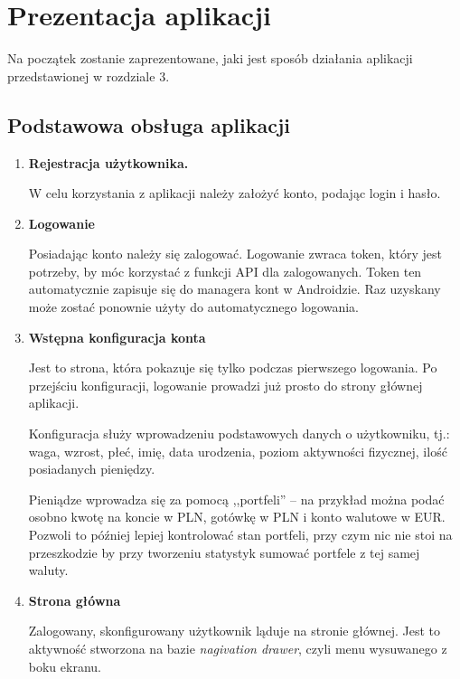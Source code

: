 \documentclass[12pt,a4paper,twoside,titlepage,openright]{book}
\begin{document}
\section{Prezentacja aplikacji}

Na początek zostanie zaprezentowane, jaki jest sposób działania aplikacji przedstawionej w rozdziale 3.

\subsection{Podstawowa obsługa aplikacji}

\begin{enumerate}
\item \textbf{Rejestracja użytkownika.} 

W celu korzystania z aplikacji należy założyć konto, podając login i hasło.
\item \textbf{Logowanie} 

Posiadając konto należy się zalogować. Logowanie zwraca token, który jest potrzeby, by móc korzystać z funkcji API dla zalogowanych. Token ten automatycznie zapisuje się do managera kont w Androidzie. Raz uzyskany może zostać ponownie użyty do automatycznego logowania.
\item \textbf{Wstępna konfiguracja konta} 

Jest to strona, która pokazuje się tylko podczas pierwszego logowania. Po przejściu konfiguracji, logowanie prowadzi już prosto do strony głównej aplikacji.

Konfiguracja służy wprowadzeniu podstawowych danych o użytkowniku, tj.: waga, wzrost, płeć, imię, data urodzenia, poziom aktywności fizycznej, ilość posiadanych pieniędzy. 

Pieniądze wprowadza się za pomocą ,,portfeli'' -- na przykład można podać osobno kwotę na koncie w PLN, gotówkę w PLN i konto walutowe w EUR. Pozwoli to później lepiej kontrolować stan portfeli, przy czym nic nie stoi na przeszkodzie by przy tworzeniu statystyk sumować portfele z tej samej waluty.

\item \textbf{Strona główna}

Zalogowany, skonfigurowany użytkownik ląduje na stronie głównej. Jest to aktywność stworzona na bazie \textit{nagivation drawer}, czyli menu wysuwanego z boku ekranu. 


\end{enumerate}
\end{document}

